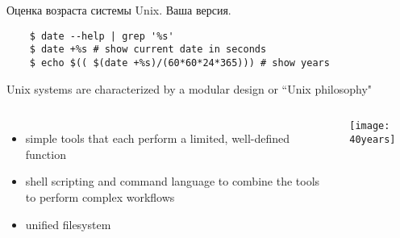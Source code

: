 \begin{frame}[fragile]{Оценка возраста системы Unix.}
Ваша версия.
 \pause
\begin{lstlisting}
    $ date --help | grep '%s'
    $ date +%s # show current date in seconds 
    $ echo $(( $(date +%s)/(60*60*24*365))) # show years
\end{lstlisting} 
\pause
Unix systems are characterized by a \alert{modular design} or ``Unix philosophy"
		\begin{columns}
\begin{itemize}
    \item simple tools that each perform a limited, well-defined function
    \item shell scripting and command language to combine the tools to perform complex workflows
    \item unified filesystem
\end{itemize}
            \texttt{[image: 40years]}
		\end{columns}
\end{frame}


